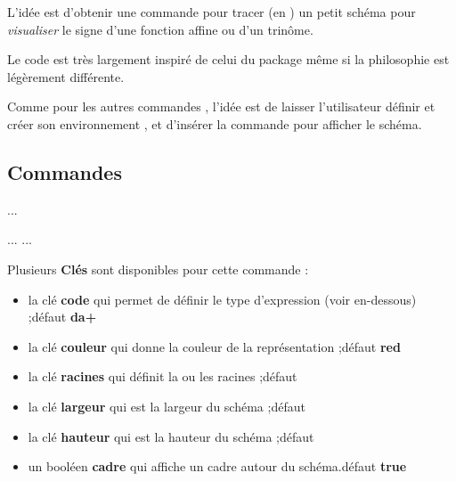 \documentclass{article}
\newcommand\ctex[1]{\tcbox[vignettelatex]{#1}}
\newcommand\Cle[1]{{\bfseries\sffamily\textlangle #1\textrangle}}
\begin{document}
\begin{codeidee}
L'idée est d'obtenir une commande pour tracer (en \TikZ) un petit schéma pour \textit{visualiser} le signe d'une fonction affine ou d'un trinôme.

Le code est très largement inspiré de celui du package \ctex{tnsana} même si la philosophie est légèrement différente.

\smallskip

Comme pour les autres commandes \TikZ, l'idée est de laisser l'utilisateur définir et créer son environnement \TikZ, et d'insérer la commande \ctex{aidesignePL} pour afficher le schéma.
\end{codeidee}

\begin{codetex}
\aidesignePL
\end{codetex}

\subsection{Commandes}

\begin{codetex}
...
\end{codetex}

\begin{codetex}
... {\tikz[<options>] \aidesignePL[<clés>]}...
\end{codetex}

\begin{codecles}
Plusieurs \Cle{Clés} sont disponibles pour cette commande :

\begin{itemize}
	\item la clé \Cle{code} qui permet de définir le type d'expression (voir en-dessous) ;\hfill{}défaut \Cle{da+}
	\item la clé \Cle{couleur} qui donne la couleur de la représentation ;\hfill{}défaut \Cle{red}
	\item la clé \Cle{racines} qui définit la ou les racines ;\hfill{}défaut \Cle{2}
	\item la clé \Cle{largeur} qui est la largeur du schéma ;\hfill{}défaut \Cle{2}
	\item la clé \Cle{hauteur} qui est la hauteur du schéma ;\hfill{}défaut \Cle{1}
	\item un booléen \Cle{cadre} qui affiche un cadre autour du schéma.\hfill{}défaut \Cle{true}
\end{itemize}
\end{codecles}
\end{document}
